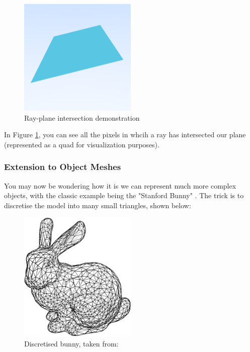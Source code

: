 \documentclass[12pt]{article}
\begin{document}
\begin{figure}[H]
    \centering
    \includegraphics[width=0.5\textwidth]{images/intersections/ray_quad_intersection.png}
    \caption{Ray-plane intersection demonstration}
    \label{fig:rayplaneintersection}
\end{figure}

In Figure \ref{fig:rayplaneintersection}, you can see all the pixels in whcih a ray has intersected our plane (represented as a quad for visualization purposes).

\subsubsection{Extension to Object Meshes}

You may now be wondering how it is we can represent much more complex objects, with the classic example being the "Stanford Bunny" \cite{stanfordbunny}. The trick is to discretise the model into many small triangles, shown below:
\begin{figure}[H]
    \centering
    \includegraphics[width=0.5\textwidth]{images/stanford_bunny.png}
    \caption{Discretised bunny, taken from: \cite{discretebunny}}
    \label{fig:discretebunny}
\end{figure}
\end{document}
